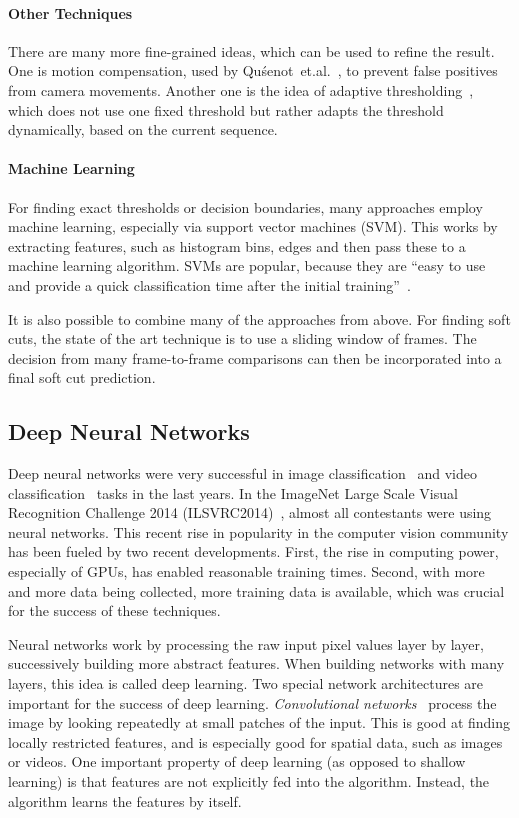 \paragraph{Other Techniques}
There are many more fine-grained ideas, which can be used to refine the result.
One is motion compensation, used by Qu{\'s}enot~et.al.~\cite{qousenot2003clips}, to prevent false positives from camera movements.
Another one is the idea of adaptive thresholding~\cite{volkmer2004rmit}, which does not use one fixed threshold but rather adapts the threshold dynamically, based on the current sequence.

\paragraph{Machine Learning}
For finding exact thresholds or decision boundaries, many approaches employ machine learning, especially via support vector machines (SVM).
This works by extracting features, such as histogram bins, edges and then pass these to a machine learning algorithm.
SVMs are popular, because they are ``easy to use and provide a quick classification time after the initial training''~\cite{smeaton2010video}.


It is also possible to combine many of the approaches from above.
For finding soft cuts, the state of the art technique is to use a sliding window of frames.
The decision from many frame-to-frame comparisons can then be incorporated into a final soft cut prediction.

\subsection{Deep Neural Networks}
Deep neural networks were very successful in image classification~\cite{krizhevsky2012imagenet} and video classification~\cite{karpathy2014large} tasks in the last years.
In the ImageNet Large Scale Visual Recognition Challenge 2014 (ILSVRC2014)~\cite{imagenet}, almost all contestants were using neural networks.
This recent rise in popularity in the computer vision community has been fueled by two recent developments.
First, the rise in computing power, especially of GPUs, has enabled reasonable training times.
Second, with more and more data being collected, more training data is available, which was crucial for the success of these techniques.

Neural networks work by processing the raw input pixel values layer by layer, successively building more abstract features.
When building networks with many layers, this idea is called deep learning.
Two special network architectures are important for the success of deep learning.
\emph{Convolutional networks}~\cite{lecun1998gradient} process the image by looking repeatedly at small patches of the input.
This is good at finding locally restricted features, and is especially good for spatial data, such as images or videos.
One important property of deep learning (as opposed to shallow learning) is that features are not explicitly fed into the algorithm.
Instead, the algorithm learns the features by itself.

